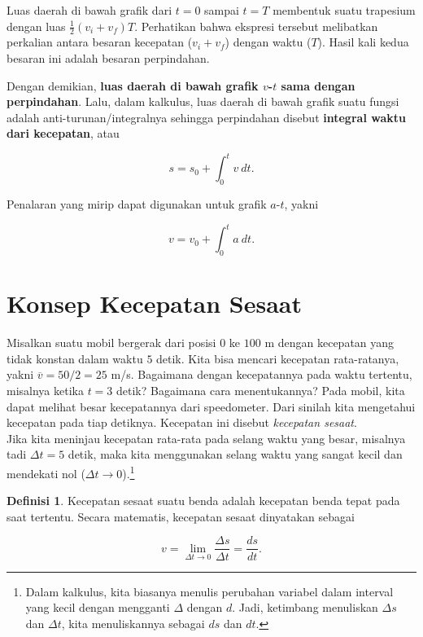 \documentclass[12pt, a4paper]{article}\usepackage[utf8]{inputenc}
\theoremstyle{plain}
\theoremstyle{plain}
\numberwithin{equation}{section}
\theoremstyle{definition}
\newtheorem{defin}[teorema]{Definisi}
\begin{document}
	Luas daerah di bawah grafik dari $t=0$ sampai $t=T$ membentuk suatu trapesium dengan luas $\frac{1}{2}(v_i + v_f)T$. Perhatikan bahwa ekspresi tersebut melibatkan perkalian antara besaran kecepatan ($v_i + v_f$) dengan waktu ($T$). Hasil kali kedua besaran ini adalah besaran perpindahan. 
	\par
	Dengan demikian, \textbf{luas daerah di bawah grafik $v$-$t$ sama dengan perpindahan}. Lalu, dalam kalkulus, luas daerah di bawah grafik suatu fungsi adalah anti-turunan/integralnya sehingga perpindahan disebut \textbf{integral waktu dari kecepatan}, atau
	
	\begin{equation}
		s = s_0 + \int_{0}^{t} v \ dt.
	\end{equation}
	
	Penalaran yang mirip dapat digunakan untuk grafik $a$-$t$, yakni
	
	\begin{equation}
		v = v_0 + \int_{0}^{t} a \ dt.
	\end{equation}
	
	\section{Konsep Kecepatan Sesaat}
	
	Misalkan suatu mobil bergerak dari posisi $0$ ke $100$ m dengan kecepatan yang tidak konstan dalam waktu $5$ detik. Kita bisa mencari kecepatan rata-ratanya, yakni $\overline{v} = 50/2 = 25$ m/s. Bagaimana dengan kecepatannya pada waktu tertentu, misalnya ketika $t = 3$ detik?  Bagaimana cara menentukannya? Pada mobil, kita dapat melihat besar kecepatannya dari speedometer. Dari sinilah kita mengetahui kecepatan pada tiap detiknya. Kecepatan ini disebut \textit{kecepatan sesaat}. \\
	
	Jika kita meninjau kecepatan rata-rata pada selang waktu yang besar, misalnya tadi $\Delta t = 5$ detik, maka kita menggunakan selang waktu yang sangat kecil dan mendekati nol ($\Delta t \to 0$).\footnote{Dalam kalkulus, kita biasanya menulis perubahan variabel dalam interval yang kecil dengan mengganti $\Delta$ dengan $d$. Jadi, ketimbang menuliskan $\Delta s$ dan $\Delta t$, kita menuliskannya sebagai $ds$ dan $dt$.}
	
	\begin{defin}
		Kecepatan sesaat suatu benda adalah kecepatan benda tepat pada saat tertentu. Secara matematis, kecepatan sesaat dinyatakan sebagai
		
		\begin{equation*}
			v = \lim_{\Delta t \to 0} \frac{\Delta s}{\Delta t} = \frac{ds}{dt}.
		\end{equation*}
	\end{defin}
	
\end{document}
